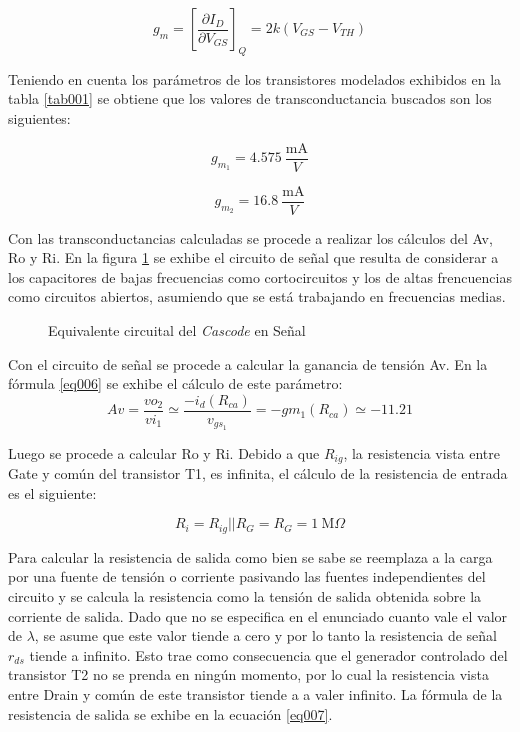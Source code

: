\documentclass[a4paper,10pt]{article}
\begin{document}
				\begin{equation}
					g_m = \left[\frac{\partial I_D}{\partial V_{GS}}\right]_{Q} = 2k(V_{GS} - V_{TH}) \label{eq005}
				\end{equation}
	
				Teniendo en cuenta los parámetros de los transistores modelados exhibidos en la tabla \ref{tab001} se obtiene que los valores de transconductancia 
				buscados son los siguientes:

				\begin{displaymath}
					g_{m_1} = 4.575~\frac{\text{mA}}{{V}}
				\end{displaymath}
			
				\begin{displaymath}
					g_{m_2} = 16.8~\frac{\text{mA}}{{V}}
				\end{displaymath}

				Con las transconductancias calculadas se procede a realizar los cálculos del Av, Ro y Ri. En la figura \ref{circ003} se exhibe el circuito de señal
				que resulta de considerar a los capacitores de bajas frecuencias como cortocircuitos y los de altas frencuencias como circuitos abiertos, asumiendo 
				que se está trabajando en frecuencias medias.  

				\begin{figure}[!htp]
					\centering
			 		
	   			\caption{Equivalente circuital del \emph{Cascode} en Señal} \label{circ003}
		 		\end{figure}

				Con el circuito de señal se procede a calcular la ganancia de tensión Av. En la fórmula \ref{eq006} se exhibe el cálculo de este parámetro:
				\begin{equation}
					Av = \frac{vo_2}{vi_1} \simeq \frac{-i_d (R_{ca})}{v_{gs_1}} = - gm_1 (R_{ca}) \simeq -11.21 \label{eq006}
				\end{equation}

				Luego se procede a calcular Ro y Ri. Debido a que $R_{ig}$, la resistencia vista entre Gate y común del transistor T1, es infinita, el cálculo de
				la resistencia de entrada es el siguiente:
				
				\begin{displaymath}
					R_i = R_{ig} || R_{G} = R_{G} = 1~\text{M}\Omega
				\end{displaymath}
	
				Para calcular la resistencia de salida como bien se sabe se reemplaza a la carga por una fuente de tensión o corriente  pasivando las fuentes 
				independientes del circuito y se calcula la resistencia como la tensión de salida obtenida sobre la corriente de salida. Dado que no se 
				especifica en el enunciado cuanto vale el valor de $\lambda$, se asume que este valor tiende a cero y por lo tanto la resistencia de 
				señal $r_{ds}$ tiende a infinito. Esto trae como consecuencia que el generador controlado del transistor T2 no se prenda en ningún momento, por
				lo cual la resistencia vista entre Drain y común de este transistor tiende a a valer infinito. La fórmula de la resistencia de salida se exhibe 
				en la ecuación \ref{eq007}. 
			
\end{document}
